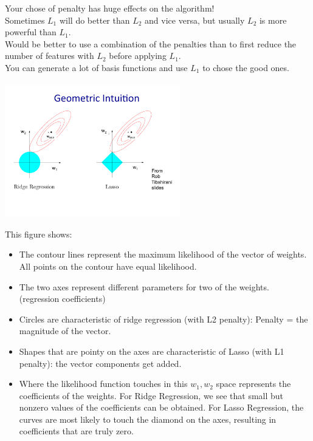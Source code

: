 Your chose of penalty has huge effects on the algorithm! \hfill \\
Sometimes $L_1$ will do better than $L_2$ and vice versa, but usually $L_2$ is more powerful than $L_1$. \hfill \\
Would be better to use a combination of the penalties than to first reduce the number of features with $L_2$ before applying $L_1$.    \hfill \\
You can generate a lot of basis functions and use $L_1$ to chose the good ones. \hfill \\
\hfill \\

\includegraphics[width=3in]{figures/lasso_and_ridge_geometry.pdf}

This figure shows: 
\begin{itemize}
	\item The contour lines represent the maximum likelihood of the vector of weights.  
		All points on the contour have equal likelihood.
	\item The two axes represent different parameters for two of the weights.  (regression coefficients)
	\item Circles are characteristic of ridge regression (with L2 penalty): Penalty = the magnitude of the vector.
	\item Shapes that are pointy on the axes are characteristic of Lasso (with L1 penalty): the vector components get added. 
	\item Where the likelihood function touches in this $w_1, w_2$ space represents the coefficients of the weights.
		For Ridge Regression, we see that small but nonzero values of the coefficients can be obtained.
		For Lasso Regression, the curves are most likely to touch the diamond on the axes, 
		resulting in coefficients that are truly zero. 
\end{itemize} 

